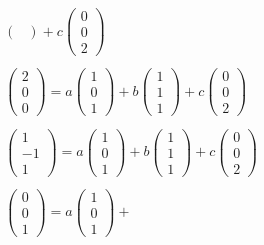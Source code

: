 \begin{example}
\begin{gather*}
\begin{pmatrix}
		\end{pmatrix} +
		c \begin{pmatrix}
			0 \\ 0 \\ 2
		\end{pmatrix}\\
		\\
		\begin{pmatrix}
			2 \\ 0 \\ 0
		\end{pmatrix} =
		a \begin{pmatrix}
			1 \\ 0 \\ 1
		\end{pmatrix} +
		b \begin{pmatrix}
			1 \\ 1 \\ 1
		\end{pmatrix} +
		c \begin{pmatrix}
			0 \\ 0 \\ 2
		\end{pmatrix}\\
		\\
		\begin{pmatrix}
			1 \\ -1 \\ 1
		\end{pmatrix} =
		a \begin{pmatrix}
			1 \\ 0 \\ 1
		\end{pmatrix} +
		b \begin{pmatrix}
			1 \\ 1 \\ 1
		\end{pmatrix} +
		c \begin{pmatrix}
			0 \\ 0 \\ 2
		\end{pmatrix}\\
		\\
		\begin{pmatrix}
			0 \\ 0 \\ 1
		\end{pmatrix} =
		a \begin{pmatrix}
			1 \\ 0 \\ 1
		\end{pmatrix} +

\end{gather*}
\end{example}
